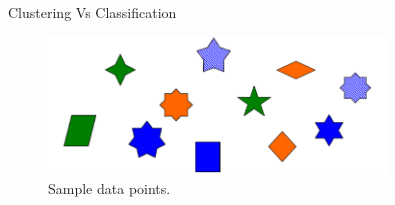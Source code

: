 \begin{frame}[allowframebreaks]{Clustering Vs Classification}
\begin{figure}
    \centering
    \includegraphics[width=0.8\textwidth,keepaspectratio]{images/sample-clustering-classification.png}
    \caption{Sample data points.}
\end{figure}

\framebreak


\end{frame}

